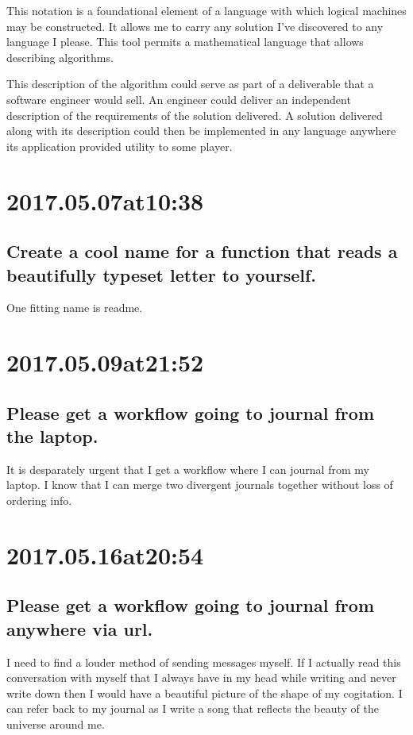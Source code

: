 \begin{enumerate}
\begin{enumerate}
This notation is a foundational element of a language with which logical machines may be constructed.
It allows me to carry any solution I've discovered to any language I please.
This tool permits a mathematical language that allows describing algorithms.

This description of the algorithm could serve as part of a deliverable that a software engineer would sell.
An engineer could deliver an independent description of the requirements of the solution delivered.
A solution delivered along with its description could then be implemented in any language anywhere its application provided utility to some player.

\section*{ 2017.05.07at10:38 }
\subsection*{ Create a cool name for a function that reads a beautifully typeset letter to yourself. }
One fitting name is readme.

\section*{ 2017.05.09at21:52 }
\subsection*{ Please get a workflow going to journal from the laptop. }
It is desparately urgent that I get a workflow where I can journal from my laptop.
I know that I can merge two divergent journals together without loss of ordering info.

\section*{ 2017.05.16at20:54 }
\subsection*{ Please get a workflow going to journal from anywhere via url. }
I need to find a louder method of sending messages myself.
If I actually read this conversation with myself that I always have in my head while writing and never write down then I would have a beautiful picture of the shape of my cogitation.
I can refer back to my journal as I write a song that reflects the beauty of the universe around me.


\end{enumerate}
\end{enumerate}
